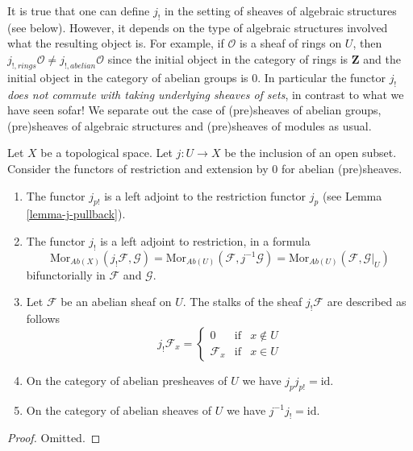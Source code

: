 \noindent
It is true that one can define $j_!$ in the setting of sheaves
of algebraic structures (see below). However, it depends on the
type of algebraic structures involved what the resulting
object is. For example, if $\mathcal{O}$ is a sheaf of rings
on $U$, then $j_{!, rings}\mathcal{O} \not = j_{!, abelian}\mathcal{O}$
since the initial object in the category of rings
is $\mathbf{Z}$ and the initial object in the category
of abelian groups is $0$. In particular the functor $j_!$
{\it does not commute with taking underlying sheaves of sets},
in contrast to what we have seen sofar! We separate out the case
of (pre)sheaves of abelian groups, (pre)sheaves of algebraic structures
and (pre)sheaves of modules as usual.

\begin{lemma}
\label{lemma-j-shriek-abelian}
Let $X$ be a topological space.
Let $j : U \to X$ be the inclusion of an open subset.
Consider the functors of restriction and extension
by $0$ for abelian (pre)sheaves.
\begin{enumerate}
\item The functor $j_{p!}$ is a left adjoint to the
restriction functor $j_p$ (see Lemma \ref{lemma-j-pullback}).
\item The functor $j_!$ is a left adjoint to restriction,
in a formula
$$
\text{Mor}_{\textit{Ab}(X)}(j_!\mathcal{F}, \mathcal{G})
=
\text{Mor}_{\textit{Ab}(U)}(\mathcal{F}, j^{-1}\mathcal{G})
=
\text{Mor}_{\textit{Ab}(U)}(\mathcal{F}, \mathcal{G}|_U)
$$
bifunctorially in $\mathcal{F}$ and $\mathcal{G}$.
\item Let $\mathcal{F}$ be an abelian sheaf on $U$.
The stalks of the sheaf $j_!\mathcal{F}$ are described
as follows
$$
j_{!}\mathcal{F}_x =
\left\{
\begin{matrix}
0 & \text{if} & x \not \in U \\
\mathcal{F}_x & \text{if} & x \in U
\end{matrix}
\right.
$$
\item On the category of abelian presheaves of $U$
we have $j_pj_{p!} = \text{id}$.
\item On the category of abelian sheaves of $U$
we have $j^{-1}j_! = \text{id}$.
\end{enumerate}
\end{lemma}

\begin{proof}
Omitted.
\end{proof}

